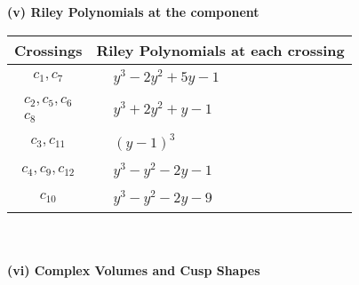 \documentclass[1p]{elsarticle_modified}
\theoremstyle{definition}
\begin{document}
\newpage\renewcommand{\arraystretch}{1}
\flushleft \textbf{(v) Riley Polynomials at the component}\newline \\
\begin{tabular}{m{50pt}|m{274pt}}
Crossings & \hspace{64pt}Riley Polynomials at each crossing \\
\hline $$\begin{aligned}c_{1},c_{7}\end{aligned}$$&$\begin{aligned}
&y^3-2 y^2+5 y-1
\end{aligned}$\\
\hline $$\begin{aligned}c_{2},c_{5},c_{6}\\c_{8}\end{aligned}$$&$\begin{aligned}
&y^3+2 y^2+y-1
\end{aligned}$\\
\hline $$\begin{aligned}c_{3},c_{11}\end{aligned}$$&$\begin{aligned}
&(y-1)^3
\end{aligned}$\\
\hline $$\begin{aligned}c_{4},c_{9},c_{12}\end{aligned}$$&$\begin{aligned}
&y^3- y^2-2 y-1
\end{aligned}$\\
\hline $$\begin{aligned}c_{10}\end{aligned}$$&$\begin{aligned}
&y^3- y^2-2 y-9
\end{aligned}$\\
\hline
\end{tabular}\\~\\
\newpage\flushleft \textbf{(vi) Complex Volumes and Cusp Shapes}
\end{document}
